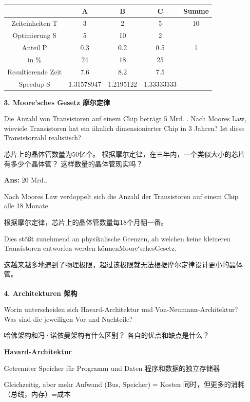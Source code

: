 \documentclass[fleqn]{article}
\begin{document}
\begin{center}
    \begin{tabular}{|c|c|c|c|c|}
        \hline
        &A&B&C&Summe\\
        \hline
        Zeiteinheiten T &3&2&5&10\\
        \hline
        Optimierung S&5&10&2&\\
        \hline
        Anteil P&0.3&0.2&0.5&1\\
        \hline
        \hline
        in \%&24&18&25&\\
        \hline
        Resultierende Zeit&7.6&8.2&7.5&\\
        \hline
        \hline
        Speedup S&1.31578947&1.2195122&1.33333333&\\
        \hline
    \end{tabular}
\end{center}

\noindent\textbf{3. Moore'sches Gesetz 摩尔定律}

Die Anzahl von Transistoren auf einem Chip beträgt 5 Mrd. . Nach Moores Law, wieviele Transistoren hat ein ähnlich dimensionierter Chip in 3 Jahren? Ist diese Transistorzahl realistisch?

芯片上的晶体管数量为50亿个。 根据摩尔定律，在三年内，一个类似大小的芯片有多少个晶体管？ 这样数量的晶体管现实吗？

\textbf{Ans:} 20 Mrd..

Nach Moores Law verdoppelt sich die Anzahl der Transistoren auf einem Chip alle 18 Monate.

根据摩尔定律，芯片上的晶体管数量每18个月翻一番。

Dies stößt zunehmend an physikalische Grenzen, ab welchen keine kleineren Transistoren entworfen werden könnenMoore‘schesGesetz.

这越来越多地遇到了物理极限，超过该极限就无法根据摩尔定律设计更小的晶体管。
\\
\\
\noindent\textbf{4. Architekturen 架构}

Worin unterscheiden sich Havard-Architektur und Von-Neumann-Architektur? Was sind die jeweiligen Vor-und Nachteile?

哈佛架构和冯·诺依曼架构有什么区别？ 各自的优点和缺点是什么？

\textbf{Havard-Architektur}
 
Getrennter Speicher für Programm und Daten 程序和数据的独立存储器

Gleichzeitig, aber mehr Aufwand (Bus, Speicher) =  Kosten 同时，但更多的消耗（总线，内存）=成本
\end{document}

